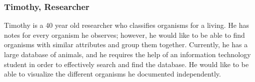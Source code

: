 \documentclass{article}
\begin{document}
\subsubsection{Timothy, Researcher}
Timothy is a 40 year old researcher who classifies organisms for a living. He has notes for every organism he observes; however, he would like to be able to find organisms with similar attributes and group them together. Currently, he has a large database of animals, and he requires the help of an information technology student in order to effectively search and find the database. He would like to be able to visualize the different organisms he documented independently.
\end{document}
